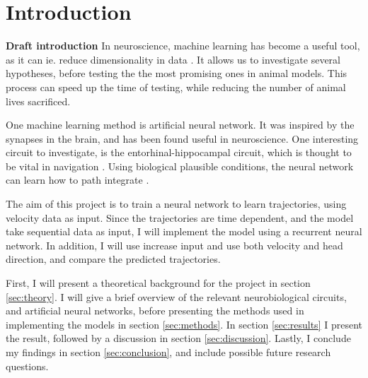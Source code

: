 \section{Introduction}\label{sec:introduction}

\textbf{Draft introduction}
In neuroscience, machine learning has become a useful tool, as it can ie. reduce dimensionality in data \cite{Badrulhisham:2024:ml_and_ai_in_neuroscience}. It allows us to investigate several hypotheses, before testing the the most promising ones in animal models. This process can speed up the time of testing, while reducing the number of animal lives sacrificed. 

One machine learning method is artificial neural network. It was inspired by the synapses in the brain, and has been found useful in neuroscience. 
One interesting circuit to investigate, is the entorhinal-hippocampal circuit, which is thought to be vital in navigation \cite{okeefe:1978:hippocampus, hafting:2005:microstructure}. Using biological plausible conditions, the neural network can learn how to path integrate \cite{banino:2018:vector_based}.

The aim of this project is to train a neural network to learn trajectories, using velocity data as input. Since the trajectories are time dependent, and the model take sequential data as input, I will implement the model using a recurrent neural network. In addition, I will use increase input and use both velocity and head direction, and compare the predicted trajectories.

First, I will present a theoretical background for the project in section \ref{sec:theory}. I will give a brief overview of the relevant neurobiological circuits, and artificial neural networks, before presenting the methods used in implementing the models in section \ref{sec:methods}. In section \ref{sec:results} I present the result, followed by a discussion in section \ref{sec:discussion}. Lastly, I conclude my findings in section \ref{sec:conclusion}, and include possible future research questions.

